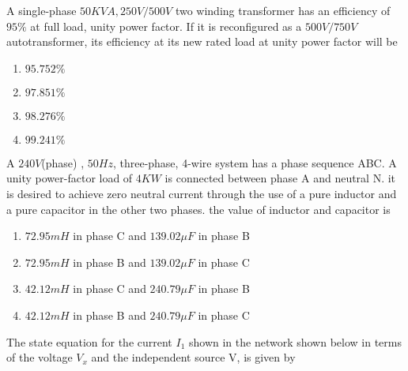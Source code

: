 \item A single-phase $50 KVA, 250V/500V$ two winding transformer has an efficiency of $95 \%$ at full load, unity power factor. If it is reconfigured as a $500V/750V$ autotransformer, its efficiency at its new rated load at unity power factor will be 
\begin{enumerate}
    \item $95.752\%$
    \item $97.851\%$
    \item $98.276\%$
    \item $99.241\%$\\
\end{enumerate}

\item A $240 V$(phase) , $50 Hz$, three-phase, 4-wire system has a phase sequence ABC. A unity power-factor load of $4 KW$ is connected between phase A and neutral N. it is desired to achieve zero neutral current through the use of a pure inductor and a pure capacitor in the other two phases. the value of inductor and capacitor is 
\begin{enumerate}
    \item $72.95 mH$ in phase C and $139.02 \mu F$ in phase B
    \item $72.95 mH$ in phase B and $139.02 \mu F$ in phase C
    \item $42.12 mH$ in phase C and $240.79 \mu F$ in phase B
    \item $42.12 mH$ in phase B and $240.79 \mu F$ in phase C \\
\end{enumerate}

\item The state equation for the current $I_1$ shown in the network shown below in terms of the voltage $V_x$ and the independent source V, is given by \\
\begin{figure}[!ht]
\centering
{}%

\label{fig:my_label}
\end{figure}


